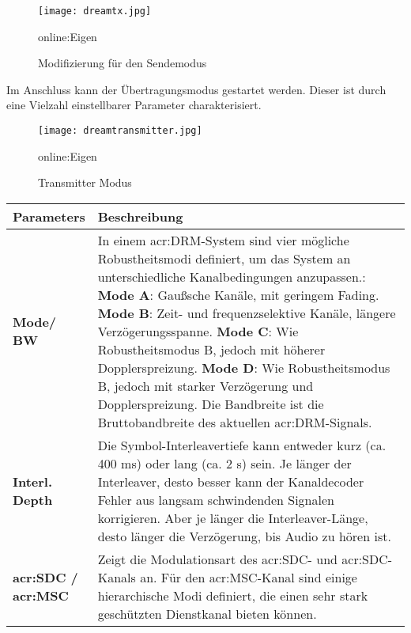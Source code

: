 \begin{figure}[H]
	\centering
	\texttt{[image: dreamtx.jpg]}
	\caption[Modifizierung für den Sendemodus]{Modifizierung für den Sendemodus} \gls{online:Eigen}
	\label{fig:dreamtx}
\end{figure}

Im Anschluss kann der Übertragungsmodus gestartet werden. Dieser ist durch eine Vielzahl einstellbarer Parameter charakterisiert. 
\begin{figure}[H]
	\centering
	\texttt{[image: dreamtransmitter.jpg]}
	\caption[Transmitter Modus]{Transmitter Modus} \gls{online:Eigen}
	\label{fig:dreamtransmitter}
\end{figure}
\begin{table}[H]
	\begin{center}
		\begin{tabular}{p{0.17\linewidth}  p{0.83\linewidth}}	
			\toprule
			\textbf{Parameters} &\textbf{Beschreibung}\\
			\midrule
			\textbf{Mode/ BW} & In einem \gls{acr:DRM}-System sind vier mögliche Robustheitsmodi definiert, um das System an unterschiedliche Kanalbedingungen anzupassen.:\newline
			\textbf{Mode A}: Gaußsche Kanäle, mit geringem Fading.\newline
			\textbf{Mode B}: Zeit- und frequenzselektive Kanäle, längere Verzögerungsspanne.\newline
			\textbf{Mode C}: Wie Robustheitsmodus B, jedoch mit höherer Dopplerspreizung.\newline
			\textbf{Mode D}: Wie Robustheitsmodus B, jedoch mit starker Verzögerung und Dopplerspreizung.\newline
			Die Bandbreite ist die Bruttobandbreite des aktuellen \gls{acr:DRM}-Signals. \\

			\textbf{Interl. Depth} & Die Symbol-Interleavertiefe kann entweder kurz (ca. 400 ms) oder lang (ca. 2 s) sein. Je länger der Interleaver, desto besser kann der Kanaldecoder Fehler aus langsam schwindenden Signalen korrigieren. Aber je länger die Interleaver-Länge, desto länger die Verzögerung, bis Audio zu hören ist.\\
				
			\textbf{\gls{acr:SDC} / \gls{acr:MSC}} & Zeigt die Modulationsart des \gls{acr:SDC}- und \gls{acr:SDC}-Kanals an. Für den \gls{acr:MSC}-Kanal sind einige hierarchische Modi definiert, die einen sehr stark geschützten Dienstkanal bieten können.\\
		

\end{tabular}
\end{center}
\end{table}
